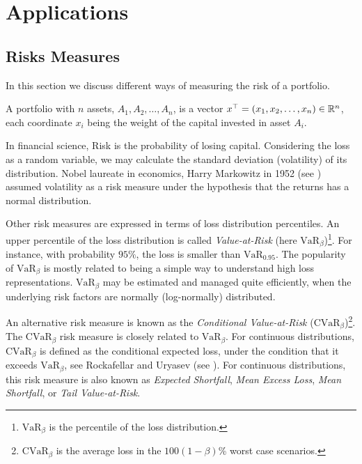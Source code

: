 \chapter{Applications} \label{chap:App}
\thispagestyle{empty}

\section{Risks Measures}

In this section we discuss different ways of measuring the risk of a portfolio.
\begin{definition}
	A portfolio with $n$ assets, $A_1, A_2, \dots, A_n$, is a vector $x^\top = (x_1, x_2, \dots, x_n)\in \mathbb{R}^n$, each coordinate $x_i$ being the weight of the capital invested in asset $A_i$.
\end{definition}

In financial science, Risk is the probability of losing capital. Considering the loss as a random variable, we may calculate the standard deviation (volatility) of its distribution. Nobel laureate in economics, Harry Markowitz in 1952 (see \cite{Markowitz1952}) assumed volatility as a risk measure under the hypothesis that the returns has a normal distribution.


Other risk measures are expressed in terms of loss distribution percentiles. An upper percentile of the loss distribution is called \textit{Value-at-Risk} (here $\mbox{VaR}_\beta$)\footnote{$\mbox{VaR}_\beta$ is the percentile of the loss distribution.}. For instance, with probability $95\%$, the loss is smaller than $\mbox{VaR}_{0.95}$. The popularity of $\mbox{VaR}_\beta$ is mostly related to being a simple way to understand high loss representations. $\mbox{VaR}_\beta$ may be estimated and managed quite efficiently, when the underlying risk factors are normally (log-normally) distributed.

An alternative risk measure is known as the \textit{Conditional Value-at-Risk} ($\mbox{CVaR}_\beta$)\footnote{$\mbox{CVaR}_\beta$ is the average loss in the $100(1-\beta)$\% worst case scenarios.}. The $\mbox{CVaR}_\beta$ risk measure is closely related to $\mbox{VaR}_\beta$. For continuous distributions, $\mbox{CVaR}_\beta$ is defined as the conditional expected loss, under the condition that it exceeds $\mbox{VaR}_\beta$, see Rockafellar and Uryasev (see \cite{RockafellarUryasev2001}). For continuous distributions, this risk measure is also known as \emph{Expected Shortfall}, \textit{Mean Excess Loss}, \textit{Mean Shortfall}, or \textit{Tail Value-at-Risk}.


